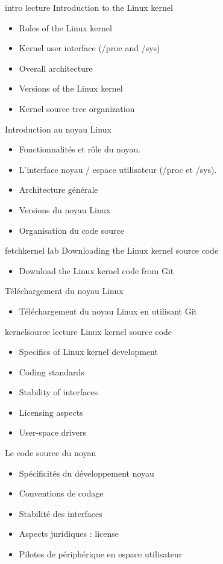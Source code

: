 {intro}
{lecture}
{Introduction to the Linux kernel}
{
  \begin{itemize}
  \item Roles of the Linux kernel
  \item Kernel user interface (/proc and /sys)
  \item Overall architecture
  \item Versions of the Linux kernel
  \item Kernel source tree organization
  \end{itemize}
}
{Introduction au noyau Linux}
{
  \begin{itemize}
  \item Fonctionnalités et rôle du noyau.
  \item L'interface noyau / espace utilisateur (/proc et /sys).
  \item Architecture générale
  \item Versions du noyau Linux
  \item Organisation du code source
  \end{itemize}
}
{fetchkernel}
{lab}
{Downloading the Linux kernel source code}
{
  \begin{itemize}
  \item Download the Linux kernel code from Git
  \end{itemize}
}
{Téléchargement du noyau Linux}
{
  \begin{itemize}
  \item Téléchargement du noyau Linux en utilisant Git
  \end{itemize}
}
{kernelsource}
{lecture}
{Linux kernel source code}
{
  \begin{itemize}
  \item Specifics of Linux kernel development
  \item Coding standards
  \item Stability of interfaces
  \item Licensing aspects
  \item User-space drivers
  \end{itemize}
}
{Le code source du noyau}
{
  \begin{itemize}
  \item Spécificités du développement noyau
  \item Conventions de codage
  \item Stabilité des interfaces
  \item Aspects juridiques : license
  \item Pilotes de périphérique en espace utilisateur
  \end{itemize}
}
